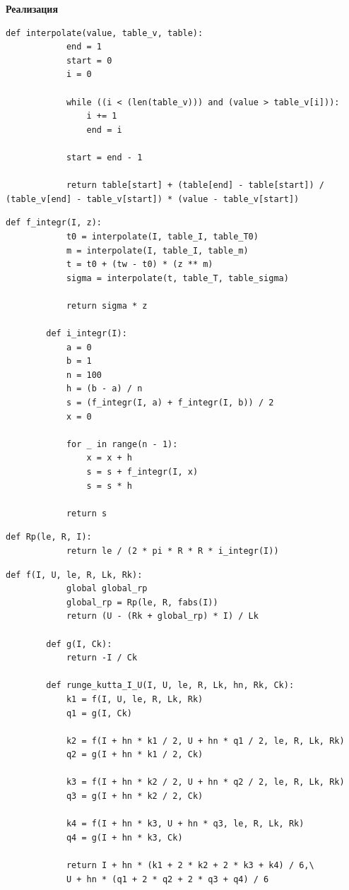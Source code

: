 \documentclass[14pt, a4paper]{extarticle}
\begin{document}
	\newpage
	\textbf{Реализация}
	
	\begin{lstlisting}[caption=Интерполяция]
		def interpolate(value, table_v, table):
			end = 1
			start = 0
			i = 0
			
			while ((i < (len(table_v))) and (value > table_v[i])):
				i += 1
				end = i
			
			start = end - 1
			
			return table[start] + (table[end] - table[start]) / (table_v[end] - table_v[start]) * (value - table_v[start])
	\end{lstlisting}

	\begin{lstlisting}[caption=Интегрирование]
		def f_integr(I, z):
			t0 = interpolate(I, table_I, table_T0)
			m = interpolate(I, table_I, table_m)
			t = t0 + (tw - t0) * (z ** m)
			sigma = interpolate(t, table_T, table_sigma)
			
			return sigma * z
		
		def i_integr(I):
			a = 0
			b = 1
			n = 100
			h = (b - a) / n
			s = (f_integr(I, a) + f_integr(I, b)) / 2
			x = 0
			
			for _ in range(n - 1):
				x = x + h
				s = s + f_integr(I, x)
				s = s * h
			
			return s
	\end{lstlisting}

	\begin{lstlisting}[caption=Вычисление сопротивления Rp]
		def Rp(le, R, I):
			return le / (2 * pi * R * R * i_integr(I))
	\end{lstlisting}

	\begin{lstlisting}[caption=Решение системы уравнений методом Рунге-Кутта]	
		def f(I, U, le, R, Lk, Rk):
			global global_rp
			global_rp = Rp(le, R, fabs(I))
			return (U - (Rk + global_rp) * I) / Lk
		
		def g(I, Ck):
			return -I / Ck
		
		def runge_kutta_I_U(I, U, le, R, Lk, hn, Rk, Ck):
			k1 = f(I, U, le, R, Lk, Rk)
			q1 = g(I, Ck)
			
			k2 = f(I + hn * k1 / 2, U + hn * q1 / 2, le, R, Lk, Rk)
			q2 = g(I + hn * k1 / 2, Ck)
			
			k3 = f(I + hn * k2 / 2, U + hn * q2 / 2, le, R, Lk, Rk)
			q3 = g(I + hn * k2 / 2, Ck)
			
			k4 = f(I + hn * k3, U + hn * q3, le, R, Lk, Rk)
			q4 = g(I + hn * k3, Ck)
			
			return I + hn * (k1 + 2 * k2 + 2 * k3 + k4) / 6,\
			U + hn * (q1 + 2 * q2 + 2 * q3 + q4) / 6
	\end{lstlisting}

	
\end{document}
